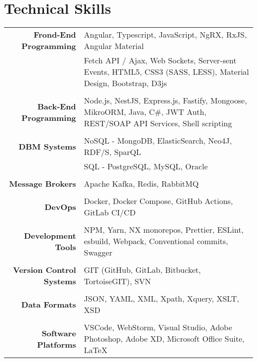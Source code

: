 \documentclass[11pt]{article}
\begin{document}
\section{Technical Skills}

\begin{longtable}{rp{12cm}}

\textbf{Frond-End Programming} 
& Angular, Typescript, JavaScript, NgRX, RxJS, Angular Material \\
& Fetch API / Ajax, Web Sockets, Server-sent Events, HTML5, CSS3 (SASS, LESS), Material Design, Bootstrap, D3js \\

\multicolumn{2}{c}{} \\
\textbf{Back-End Programming} 
& Node.js, NestJS, Express.js, Fastify, Mongoose, MikroORM, Java, C\#, JWT Auth, REST/SOAP API Services, Shell scripting \\

\multicolumn{2}{c}{} \\
\textbf{DBM Systems} 
& NoSQL - MongoDB, ElasticSearch, Neo4J, RDF/S, SparQL \\
& SQL - PostgreSQL, MySQL, Oracle  \\

\multicolumn{2}{c}{} \\
\textbf{Message Brokers} 
& Apache Kafka, Redis, RabbitMQ \\

\multicolumn{2}{c}{} \\
\textbf{DevOps} 
& Docker, Docker Compose, GitHub Actions, GitLab CI/CD \\

\multicolumn{2}{c}{} \\
\textbf{Development Tools} 
& NPM, Yarn, NX monorepos, Prettier, ESLint, esbuild, Webpack, Conventional commits, Swagger \\

\multicolumn{2}{c}{} \\
\textbf{Version Control Systems} 
& GIT (GitHub, GitLab, Bitbucket, TortoiseGIT), SVN \\

\multicolumn{2}{c}{} \\
\textbf{Data Formats} 
& JSON, YAML, XML, Xpath, Xquery, XSLT, XSD \\

\multicolumn{2}{c}{} \\
\textbf{Software Platforms} 
& VSCode, WebStorm, Visual Studio, Adobe Photoshop, Adobe XD, Microsoft Office Suite, \LaTeX \\


\end{longtable}
\end{document}
